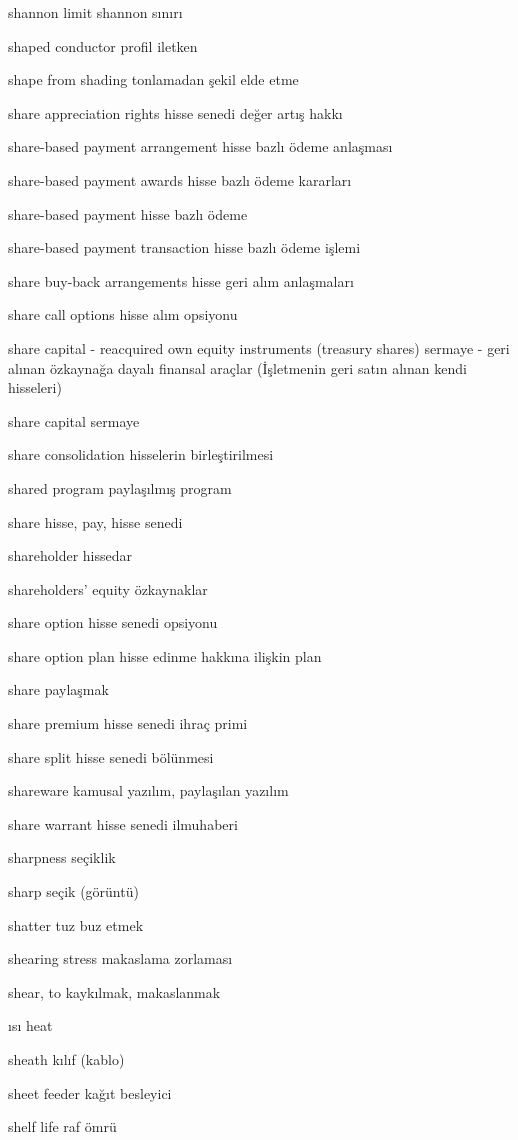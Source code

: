 \documentclass[12pt,fleqn]{article}\usepackage{../../common}
\begin{document}
shannon limit shannon sınırı

shaped conductor profil iletken

shape from shading tonlamadan şekil elde etme

share appreciation rights hisse senedi değer artış hakkı

share-based payment arrangement hisse bazlı ödeme anlaşması

share-based payment awards hisse bazlı ödeme kararları

share-based payment hisse bazlı ödeme

share-based payment transaction hisse bazlı ödeme işlemi

share buy-back arrangements hisse geri alım anlaşmaları

share call options hisse alım opsiyonu

share capital - reacquired own equity instruments (treasury shares) sermaye - geri alınan özkaynağa dayalı finansal araçlar (İşletmenin geri satın alınan kendi hisseleri)

share capital sermaye

share consolidation hisselerin birleştirilmesi

shared program paylaşılmış program

share hisse, pay, hisse senedi

shareholder hissedar

shareholders' equity özkaynaklar

share option hisse senedi opsiyonu

share option plan hisse edinme hakkına ilişkin plan

share paylaşmak

share premium hisse senedi ihraç primi

share split hisse senedi bölünmesi

shareware kamusal yazılım, paylaşılan yazılım

share warrant hisse senedi ilmuhaberi

sharpness seçiklik

sharp seçik (görüntü)

shatter tuz buz etmek

shearing stress makaslama zorlaması

shear, to kaykılmak, makaslanmak

ısı heat

sheath kılıf (kablo)

sheet feeder kağıt besleyici

shelf life raf ömrü
\end{document}
